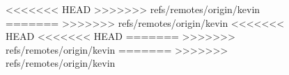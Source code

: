 \documentclass{nature}
\begin{document}
{\begin{figure}[tb]
<<<<<<< HEAD
>>>>>>> refs/remotes/origin/kevin
=======
>>>>>>> refs/remotes/origin/kevin
%
<<<<<<< HEAD
<<<<<<< HEAD
=======
>>>>>>> refs/remotes/origin/kevin
=======
>>>>>>> refs/remotes/origin/kevin
%

\end{figure}}
\end{document}
